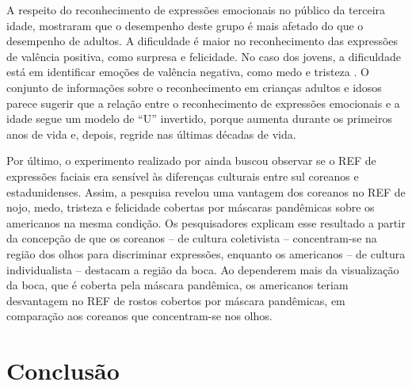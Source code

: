 \documentclass[portuguese]{textolivre}
\begin{document}
A respeito do reconhecimento de expressões emocionais no público da terceira  idade, \textcite{kang_age_2021} mostraram que o desempenho deste grupo é mais afetado do que o desempenho de adultos. A dificuldade é maior no reconhecimento das expressões de valência positiva, como surpresa e felicidade. No caso dos jovens, a dificuldade está em identificar emoções de valência negativa, como medo e tristeza \cite{kang_age_2021}. O conjunto de informações sobre o reconhecimento em crianças \cite{carbon_impact_2021, gori_masking_2021, ruba_childrens_2020} adultos e idosos \cite{kang_age_2021} parece sugerir que a relação entre o reconhecimento de expressões emocionais e a idade segue um modelo de “U” invertido, porque aumenta durante os primeiros anos de vida e, depois, regride nas últimas décadas de vida.

Por último, o experimento realizado por \textcite{kang_age_2021} ainda buscou observar se o REF de expressões faciais era sensível às diferenças culturais entre sul coreanos e estadunidenses. Assim, a pesquisa revelou uma vantagem dos coreanos no REF de nojo, medo, tristeza e felicidade cobertas por máscaras pandêmicas sobre os americanos na mesma condição. Os pesquisadores explicam esse resultado a partir da concepção de que os coreanos – de cultura coletivista – concentram-se na região dos olhos para discriminar expressões, enquanto os americanos – de cultura individualista – destacam a região da boca. Ao dependerem mais da visualização da boca, que é coberta pela máscara pandêmica, os americanos teriam desvantagem no REF de rostos cobertos por máscara pandêmicas, em comparação aos coreanos que concentram-se nos olhos.


\section{Conclusão}
\end{document}
